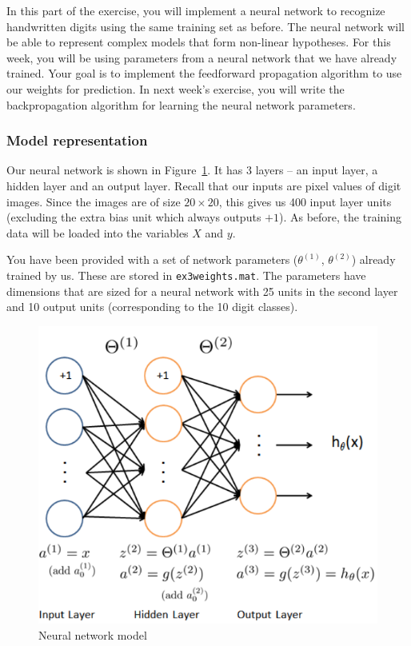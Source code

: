 \documentclass[12pt]{article}
\begin{document}
In this part of the exercise, you will implement a neural network to recognize handwritten digits using the same training set as before. The neural network will be able to represent complex models that form non-linear hypotheses. For this week, you will be using parameters from a neural network that we have already trained. Your goal is to implement the feedforward propagation algorithm to use our weights for prediction. In next week’s exercise, you will write the backpropagation algorithm for learning the neural network parameters.

\subsubsection{Model representation}

Our neural network is shown in Figure~\ref{fig:nn}. It has 3 layers -- an input layer, a hidden layer and an output layer. Recall that our inputs are pixel values of digit images. Since the images are of size $20 \times 20$, this gives us 400 input layer units (excluding the extra bias unit which always outputs $+1$). As before,
the training data will be loaded into the variables $X$ and $y$.

You have been provided with a set of network parameters ($\theta^{(1)}$, $\theta^{(2)}$) already trained by us. These are stored in \texttt{ex3weights.mat}. The parameters have dimensions that are sized for a neural network with 25 units in the second layer and 10 output units (corresponding to the 10 digit classes).


\begin{figure}[h!]
  \centering
  \includegraphics[scale=0.6]{nn.png}
  \caption{Neural network model}
  \label{fig:nn}
\end{figure}
\end{document}
